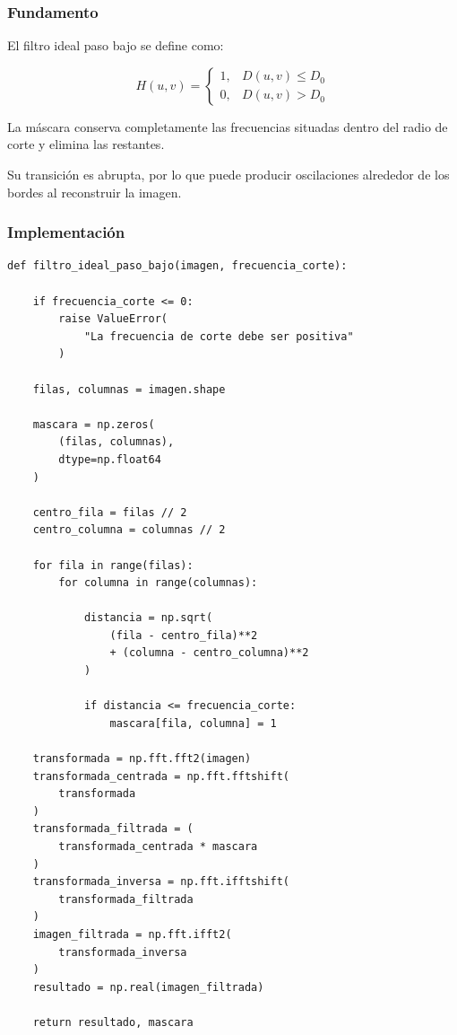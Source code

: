 \documentclass[11pt,letterpaper]{article}
\begin{document}
\subsubsection*{Fundamento}

El filtro ideal paso bajo se define como:

\begin{equation}
H(u,v)=
\begin{cases}
1, & D(u,v)\leq D_0\\
0, & D(u,v)>D_0
\end{cases}
\end{equation}

La máscara conserva completamente las
frecuencias situadas dentro del radio
de corte y elimina las restantes.

Su transición es abrupta, por lo que
puede producir oscilaciones alrededor
de los bordes al reconstruir la imagen.

\subsubsection*{Implementación}

\begin{lstlisting}
def filtro_ideal_paso_bajo(imagen, frecuencia_corte):

    if frecuencia_corte <= 0:
        raise ValueError(
            "La frecuencia de corte debe ser positiva"
        )

    filas, columnas = imagen.shape

    mascara = np.zeros(
        (filas, columnas),
        dtype=np.float64
    )

    centro_fila = filas // 2
    centro_columna = columnas // 2

    for fila in range(filas):
        for columna in range(columnas):

            distancia = np.sqrt(
                (fila - centro_fila)**2
                + (columna - centro_columna)**2
            )

            if distancia <= frecuencia_corte:
                mascara[fila, columna] = 1

    transformada = np.fft.fft2(imagen)
    transformada_centrada = np.fft.fftshift(
        transformada
    )
    transformada_filtrada = (
        transformada_centrada * mascara
    )
    transformada_inversa = np.fft.ifftshift(
        transformada_filtrada
    )
    imagen_filtrada = np.fft.ifft2(
        transformada_inversa
    )
    resultado = np.real(imagen_filtrada)

    return resultado, mascara
\end{lstlisting}
\end{document}
